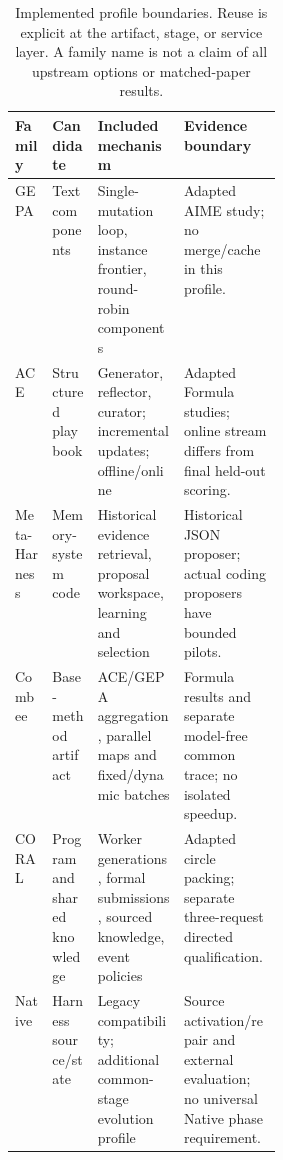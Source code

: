 \begin{table}[t]
\caption{Implemented profile boundaries. Reuse is explicit at the artifact, stage, or service layer. A family name is not a claim of all upstream options or matched-paper results.}
\label{tab:profiles}
\small
\begin{tabularx}{\linewidth}{@{}>{\raggedright\arraybackslash}p{0.14\linewidth}>{\raggedright\arraybackslash}p{0.17\linewidth}Y Y@{}}
\toprule
Family & Candidate & Included mechanism & Evidence boundary \\
\midrule
GEPA & Text components & Single-mutation loop, instance frontier, round-robin components & Adapted AIME study; no merge/cache in this profile. \\
ACE & Structured playbook & Generator, reflector, curator; incremental updates; offline/online & Adapted Formula studies; online stream differs from final held-out scoring. \\
Meta-Harness & Memory-system code & Historical evidence retrieval, proposal workspace, learning and selection & Historical JSON proposer; actual coding proposers have bounded pilots. \\
Combee & Base-method artifact & ACE/GEPA aggregation, parallel maps and fixed/dynamic batches & Formula results and separate model-free common trace; no isolated speedup. \\
CORAL & Program and shared knowledge & Worker generations, formal submissions, sourced knowledge, event policies & Adapted circle packing; separate three-request directed qualification. \\
Native & Harness source/state & Legacy compatibility; additional common-stage evolution profile & Source activation/repair and external evaluation; no universal Native phase requirement. \\
\bottomrule
\end{tabularx}
\end{table}
